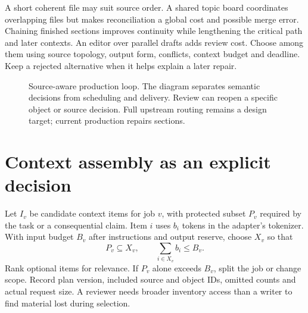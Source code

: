 \documentclass[11pt,letterpaper]{article}
\begin{document}
A short coherent file may suit source order. A shared topic board coordinates overlapping files but makes reconciliation a global cost and possible merge error. Chaining finished sections improves continuity while lengthening the critical path and later contexts. An editor over parallel drafts adds review cost. Choose among them using source topology, output form, conflicts, context budget and deadline. Keep a rejected alternative when it helps explain a later repair.

\begin{figure}[t]
\centering
{}
\caption{Source-aware production loop. The diagram separates semantic decisions from scheduling and delivery. Review can reopen a specific object or source decision. Full upstream routing remains a design target; current production repairs sections.}
\label{fig:flow}
\end{figure}

\section{Context assembly as an explicit decision}
Let $I_v$ be candidate context items for job $v$, with protected subset $P_v$ required by the task or a consequential claim. Item $i$ uses $b_i$ tokens in the adapter's tokenizer. With input budget $B_v$ after instructions and output reserve, choose $X_v$ so that
\begin{equation}
P_v\subseteq X_v,\qquad \sum_{i\in X_v} b_i\leq B_v.
\label{eq:context}
\end{equation}
Rank optional items for relevance. If $P_v$ alone exceeds $B_v$, split the job or change scope. Record plan version, included source and object IDs, omitted counts and actual request size. A reviewer needs broader inventory access than a writer to find material lost during selection.
\end{document}
